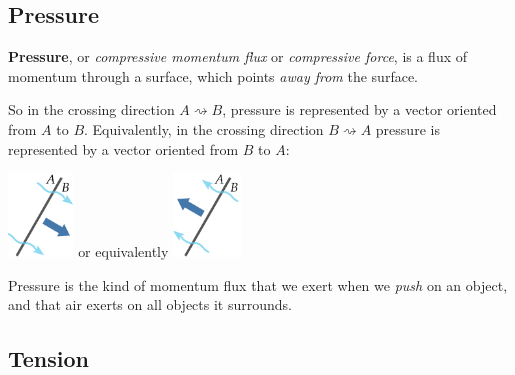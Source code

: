 \documentclass[a4paper,12pt,%
onecolumn,oneside,%
british%
]{memoir}
\providecommand{\href}[2]{#2}
\renewcommand*{\|}[1][]{\nonscript\:#1\vert\nonscript\:\mathopen{}}
\newcommand*{\furl}[2]{\href{#1}{#2}\pagenote{\url{#1}}}
\begin{document}
\subsection{Pressure}
\label{sec:pressure}

\textbf{Pressure}, or \emph{compressive momentum flux} or \emph{compressive force}, is a flux of momentum through a surface, which points \emph{away from} the surface.

So in the crossing direction $A\!\rightsquigarrow\!B$, pressure is represented by a vector oriented from $A$ to $B$. Equivalently, in the crossing direction $B\!\rightsquigarrow\!A$ pressure is represented by a vector oriented from $B$ to $A$:\noprelistbreak
\begin{center}\medskip
  \hspace*{\fill}
  \includegraphics[align=c,height=6em]{images/pressure_right.pdf}
  \hfill{\small or equivalently}\hfill
  \includegraphics[align=c,height=6em]{images/pressure_left.pdf}
  \hspace*{\fill}
\end{center}


Pressure is the kind of momentum flux that we exert when we \emph{push} on an object, and that air exerts on all objects it surrounds.

\subsection{Tension}
\label{sec:tension}
\end{document}
